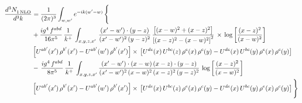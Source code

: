 \documentclass[9pt]{article}
\numberwithin{equation}{section}
\begin{document}
\begin{align}
   \frac{d^{3}N_{1\,\rm NLO}^{\rm}}{d^{3}k}  & =  \frac{1}{(2\pi)^{3}}  \int_{w, w^\prime} e^{-ik(w^\prime-w)}\, \Bigg\{\notag \\
&  +\frac{ig^{4}\,f^{abd}}{16\pi^{5}}\, \frac{1}{k^{+}}\,\int_{x,y,z,x'}\, \frac{(x'-w')\cdot (y-z)}{(x'-w')^{2}\,(y-z)^{2}}\, \frac{\left[(x-w)^{2}+(x-z)^{2}\right]}{\left[(x-z)^{2}-(x-w)^{2}\right]^{2}}\, \times\, \log{\left[\frac{(x-z)^{2}}{(x-w)^{2}}\right]}\notag \\ & \left[U^{ab'}(x')\,\rho^{b'}(x')-U^{ab'}(w')\, \rho^{b'}(x')\right]\times\, \left[U^{de}(x)\,U^{bc}(z)\, \rho^{e}(x)\,\rho^{c}(y)-U^{de}(x)\,U^{bc}(y)\,\rho^{e}(x)\,\rho^{c}(y)\right] \notag \\
& -\, \frac{ig^{4}\,f^{abd}}{8\pi^{5}}\,\frac{1}{k^{+}}\,\int_{x,y,z,x'}\frac{(x'-w')\cdot (x-w)\, (x-z)\cdot (y-z)}{(x'-w')^{2}\, (x-w)^{2}\, (x-z)^{2}\, (y-z)^{2}}\,\log{\left[\frac{(x-z)^{2}}{(x-w)^{2}}\right]} \notag \\ & \left[U^{ab'}(x')\,\rho^{b'}(x')-U^{ab'}(w')\, \rho^{b'}(x')\right]\times\, \left[U^{de}(x)\,U^{bc}(z)\, \rho^{e}(x)\,\rho^{c}(y)-U^{de}(x)\,U^{bc}(y)\,\rho^{e}(x)\,\rho^{c}(y)\right]\Bigg\}
\end{align}
\end{document}
